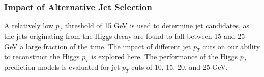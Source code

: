 \subsubsection{Impact of Alternative Jet Selection}
\label{subsec:ptCutApx}

A relatively low $p_T$ threshold of 15 GeV is used to determine jet candidates, as the jets originating from the Higgs decay are found to fall between 15 and 25 GeV a large fraction of the time. The impact of different jet $p_T$ cuts on our ability to reconstruct the Higgs $p_T$ is explored here. The performance of the Higgs $p_T$ prediction models is evaluated for jet $p_T$ cuts of 10, 15, 20, and 25 GeV.

\begin{figure}[h!]
    \\           
    \\                       
    \caption{}
    \label{fig:pt2lSS_20}
\end{figure} 

